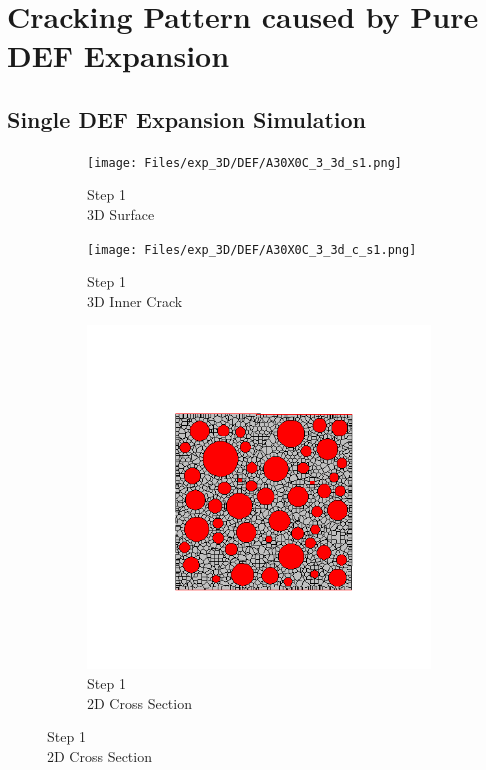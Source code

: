 \section{Cracking Pattern caused by Pure DEF Expansion}

\subsection{Single DEF Expansion Simulation}

\begin{figure}[ht!]
\centering
    \begin{subfigure}{.25\textwidth}
      \centering
      \texttt{[image: Files/exp\_3D/DEF/A30X0C\_3\_3d\_s1.png]}
      \caption{Step 1\\3D Surface}
    \end{subfigure}%
    \begin{subfigure}{.25\textwidth}
      \centering
      \texttt{[image: Files/exp\_3D/DEF/A30X0C\_3\_3d\_c\_s1.png]}
      \caption{Step 1\\3D Inner Crack}
    \end{subfigure}%
    \begin{subfigure}{.25\textwidth}
      \centering
      \includegraphics[width=.8\linewidth]{Files/exp_3D/DEF/A30X0C_3_c1.png}
      \caption{Step 1\\2D Cross Section}
    \end{subfigure}%

\end{figure}
